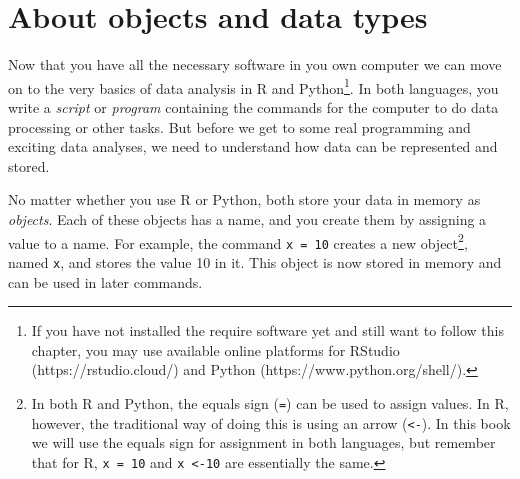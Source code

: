 \newcommand{\fnarrow}{\footnote{In both R and Python, the equals
  sign (\texttt{=}) can be used to assign values. In R, however, the
  traditional way of doing this is using an arrow (\texttt{\textless-}). In
  this book we will use the equals sign for assignment in both
  languages, but remember that for R, \texttt{x = 10} and
  \texttt{x \textless-10} are essentially the same.}}


\section{About objects and data types}
\label{sec:datatypes}

Now that you have all the necessary software in you own computer we
can move on to the very basics of data analysis in R and
Python\footnote{If you have not installed the require software yet and
  still want to follow this chapter, you may use available online
  platforms for RStudio (https://rstudio.cloud/) and Python
  (https://www.python.org/shell/).}.  In both languages, you write a
\emph{script} or \emph{program} containing the commands for the
computer to do data processing or other tasks.  But before we get to
some real programming and exciting data analyses, we need to understand
how data can be represented and stored.

No matter whether you use R or Python, both store your data in memory as \emph{objects}.
Each of these objects has a name, and you create them by
assigning a value to a name. For example, the command \texttt{x = 10}
creates a new object\fnarrow, named \texttt{x}, and stores the value 10
in it.  This object is now stored in memory and can be used in later
commands.


